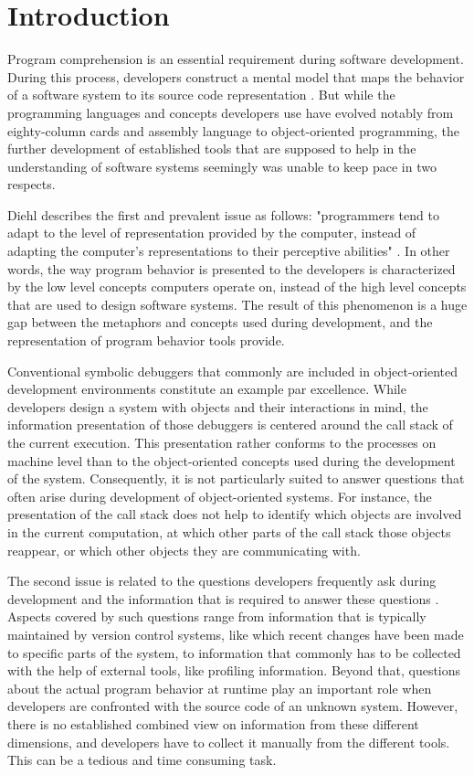 \chapter{Introduction}
\label{c:introduction}

Program comprehension is an essential requirement during software development.
During this process, developers construct a mental model that maps the behavior of a software system to its source code representation \cite{latoza_maintaining_2006}.
But while the programming languages and concepts developers use have evolved notably from eighty-column cards and assembly language to object-oriented programming, the further development of established tools that are supposed to help in the understanding of software systems seemingly was unable to keep pace in two respects.

Diehl describes the first and prevalent issue as follows: "programmers tend to adapt to the level of representation provided by the computer, instead of adapting the computer's representations to their perceptive abilities" \cite{diehl_software_2007}.
In other words, the way program behavior is presented to the developers is characterized by the low level concepts computers operate on, instead of the high level concepts that are used to design software systems.
The result of this phenomenon is a huge gap between the metaphors and concepts used during development, and the representation of program behavior tools provide.

Conventional symbolic debuggers that commonly are included in object-oriented development environments constitute an example par excellence.
While developers design a system with objects and their interactions in mind, the information presentation of those debuggers is centered around the call stack of the current execution.
This presentation rather conforms to the processes on machine level than to the object-oriented concepts used during the development of the system.
Consequently, it is not particularly suited to answer questions that often arise during development of object-oriented systems.
For instance, the presentation of the call stack does not help to identify which objects are involved in the current computation, at which other parts of the call stack those objects reappear, or which other objects they are communicating with.

The second issue is related to the questions developers frequently ask during development and the information that is required to answer these questions \cite{sillito_asking_2008, latoza_hard--answer_2010, abi-antoun_questions_2010}.
Aspects covered by such questions range from information that is typically maintained by version control systems, like which recent changes have been made to specific parts of the system, to information that commonly has to be collected with the help of external tools, like profiling information.
Beyond that, questions about the actual program behavior at runtime play an important role when developers are confronted with the source code of an unknown system.
However, there is no established combined view on information from these different dimensions, and developers have to collect it manually from the different tools.
This can be a tedious and time consuming task.

